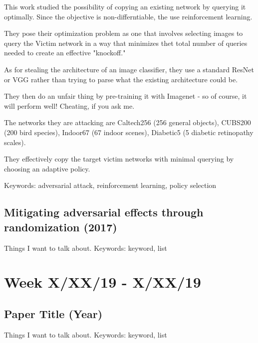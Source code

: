 \documentclass{article}
\begin{document}
This work studied the possibility of copying an existing network by querying it optimally. Since the objective is non-differntiable, the use reinforcement learning.

They pose their optimization problem as one that involves selecting images to query the Victim network in a way that minimizes thet total number of queries needed to create an effective "knockoff."

As for stealing the architecture of an image classifier, they use a standard ResNet or VGG rather than trying to parse what the existing architecture could be.

They then do an unfair thing by pre-training it with Imagenet - so of course, it will perform well! Cheating, if you ask me.

The networks they are attacking are Caltech256 (256 general objects), CUBS200 (200 bird species), Indoor67 (67 indoor scenes), Diabetic5 (5 diabetic retinopathy scales).

They effectively copy the target victim networks with minimal querying by choosing an adaptive policy.

\newline\newline
Keywords: adversarial attack, reinforcement learning, policy selection

\subsection*{Mitigating adversarial effects through randomization (2017)\cite{xie2017mitigating}}

Things I want to talk about.
\newline\newline
Keywords: keyword, list

\section*{Week X/XX/19 - X/XX/19}
\subsection*{Paper Title (Year)\cite{miller2019adversarial}}

Things I want to talk about.
\newline\newline
Keywords: keyword, list




\end{document}
